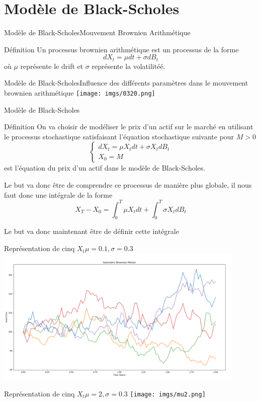 \documentclass{beamer}
\newcommand{\1}{\mathmybb{1}}
\begin{document}
\section{Modèle de Black-Scholes}
\begin{frame}{Modèle de Black-Scholes}{Mouvement Brownien Arithmétique}
  \begin{block}{Définition}
    Un processus brownien arithmétique est un processus de la forme
    \begin{equation}
      dX_{t} = \mu dt + \sigma dB_{t}
    \end{equation}
    où $\mu$ représente le drift et $\sigma$ représente la volatilitéé.
    \end{block}
  \end{frame}
  \begin{frame}{Modèle de Black-Scholes}{Influence des différents paramètres dans le mouvement brownien arithmétique}
    \texttt{[image: imgs/0320.png]}
  \end{frame}
\begin{frame}{Modèle de Black-Scholes}
  \begin{block}{Définition}
    On va choisir de modéliser le prix d'un actif sur le marché en utilisant le processus stochastique satisfaisant l'équation stochastique suivante pour $M > 0$
    \begin{equation}
      \begin{cases}
        dX_{t} = \mu X_{t} dt + \sigma X_{t} dB_{t} \\
        X_{0} = M
      \end{cases}
      \end{equation}
      est l'équation du prix d'un actif dans le modèle de Black-Scholes. \\
    \end{block}
    \pause
    \begin{alertblock}{}
    Le but va donc être de comprendre ce processus de manière plus globale, il nous faut donc une intégrale de la forme
    \[
      X_{T} - X_{0} = \int_0^{T} \mu X_{t} dt + \int_{0}^{T} \sigma X_{t} dB_{t}
    \]
  \end{alertblock}
  \pause
  Le but va donc maintenant être de définir cette intégrale
\end{frame}
 \begin{frame}{Représentation de cinq $X_{t}$}{$\mu =0.1, \sigma =0.3$}
   \includegraphics[width=12cm]{imgs/bs5.png}
 \end{frame}
 \begin{frame}{Représentation de cinq $X_{t}$}{$\mu =2, \sigma =0.3$}
   \texttt{[image: imgs/mu2.png]}
 \end{frame}
\end{document}
